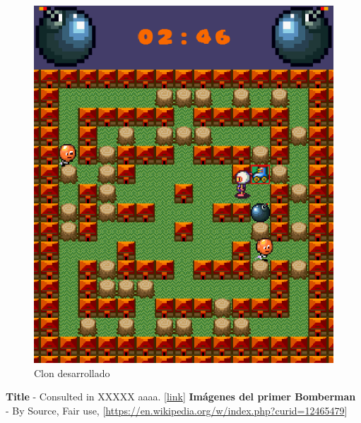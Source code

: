 \documentclass[a4paper]{article}
\begin{document}
\begin{figure}[H]
\begin{minipage}[b]{0.4\textwidth}
		\includegraphics[width=\textwidth]{bomberman.png}
		\caption{Clon desarrollado}
	\end{minipage}
	\label{fig:primerBomberman}
\end{figure}

\newpage
\begin{thebibliography}{99} 
 \textbf{Title} - Consulted in XXXXX aaaa. [\url{link}]
 \textbf{Imágenes del primer Bomberman} - By Source, Fair use, [\url{https://en.wikipedia.org/w/index.php?curid=12465479}]

\end{thebibliography}
\end{document}
